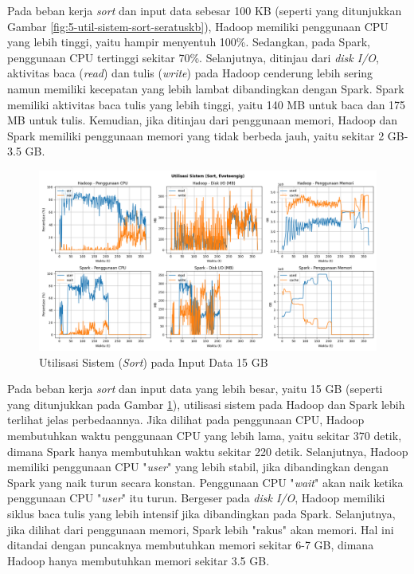 Pada beban kerja \textit{sort} dan input data sebesar 100 KB (seperti yang ditunjukkan Gambar \ref{fig:5-util-sistem-sort-seratuskb}), Hadoop memiliki penggunaan CPU yang lebih tinggi, yaitu hampir menyentuh 100\%. Sedangkan, pada Spark, penggunaan CPU tertinggi sekitar 70\%. Selanjutnya, ditinjau dari \textit{disk I/O}, aktivitas baca (\textit{read}) dan tulis (\textit{write}) pada Hadoop cenderung lebih sering namun memiliki kecepatan yang lebih lambat dibandingkan dengan Spark. Spark memiliki aktivitas baca tulis yang lebih tinggi, yaitu 140 MB untuk baca dan 175 MB untuk tulis. Kemudian, jika ditinjau dari penggunaan memori, Hadoop dan Spark memiliki penggunaan memori yang tidak berbeda jauh, yaitu sekitar 2 GB-3.5 GB.

\begin{figure}[h]
    \centering
    \includegraphics[width=1\textwidth]{figures/ch04/5-util-sistem-sort-fiveteengig}
    \caption{Utilisasi Sistem (\textit{Sort}) pada Input Data 15 GB}
    \label{fig:5-util-sistem-sort-fiveteengig}
\end{figure}

Pada beban kerja \textit{sort} dan input data yang lebih besar, yaitu 15 GB (seperti yang ditunjukkan pada Gambar \ref{fig:5-util-sistem-sort-fiveteengig}), utilisasi sistem pada Hadoop dan Spark lebih terlihat jelas perbedaannya. Jika dilihat pada penggunaan CPU, Hadoop membutuhkan waktu penggunaan CPU yang lebih lama, yaitu sekitar 370 detik, dimana Spark hanya membutuhkan waktu sekitar 220 detik. Selanjutnya, Hadoop memiliki penggunaan CPU "\textit{user}" yang lebih stabil, jika dibandingkan dengan Spark yang naik turun secara konstan. Penggunaan CPU "\textit{wait}" akan naik ketika penggunaan CPU "\textit{user}" itu turun. Bergeser pada \textit{disk I/O}, Hadoop memiliki siklus baca tulis yang lebih intensif jika dibandingkan pada Spark. Selanjutnya, jika dilihat dari penggunaan memori, Spark lebih "rakus" akan memori. Hal ini ditandai dengan puncaknya membutuhkan memori sekitar 6-7 GB, dimana Hadoop hanya membutuhkan memori sekitar 3.5 GB.


